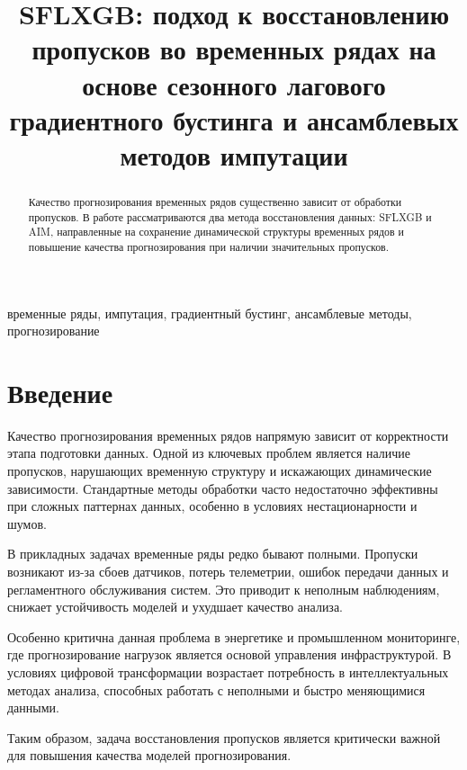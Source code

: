 \documentclass[conference]{IEEEtran}
\begin{document}
\title{SFLXGB: подход к восстановлению пропусков во временных рядах на основе сезонного лагового градиентного бустинга и ансамблевых методов импутации}

\author{
}

\maketitle

\begin{abstract}
Качество прогнозирования временных рядов существенно зависит от обработки пропусков. В работе рассматриваются два метода восстановления данных: SFLXGB и AIM, направленные на сохранение динамической структуры временных рядов и повышение качества прогнозирования при наличии значительных пропусков.
\end{abstract}

\begin{IEEEkeywords}
временные ряды, импутация, градиентный бустинг, ансамблевые методы, прогнозирование
\end{IEEEkeywords}

\section{Введение}

Качество прогнозирования временных рядов напрямую зависит от корректности этапа подготовки данных. Одной из ключевых проблем является наличие пропусков, нарушающих временную структуру и искажающих динамические зависимости. Стандартные методы обработки часто недостаточно эффективны при сложных паттернах данных, особенно в условиях нестационарности и шумов.

В прикладных задачах временные ряды редко бывают полными. Пропуски возникают из-за сбоев датчиков, потерь телеметрии, ошибок передачи данных и регламентного обслуживания систем. Это приводит к неполным наблюдениям, снижает устойчивость моделей и ухудшает качество анализа.

Особенно критична данная проблема в энергетике и промышленном мониторинге, где прогнозирование нагрузок является основой управления инфраструктурой. В условиях цифровой трансформации возрастает потребность в интеллектуальных методах анализа, способных работать с неполными и быстро меняющимися данными.

Таким образом, задача восстановления пропусков является критически важной для повышения качества моделей прогнозирования.
\end{document}
